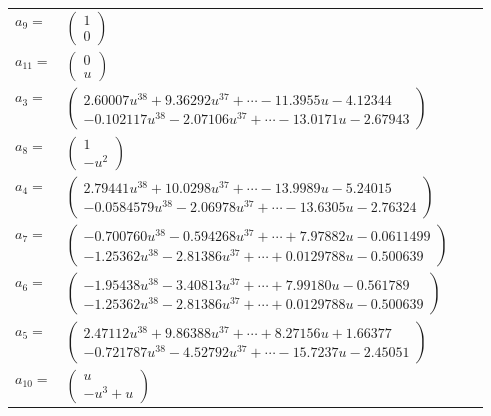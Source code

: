 \documentclass[1p]{elsarticle_modified}
\theoremstyle{definition}
\begin{document}
\begin{tabular}{m{7pt} m{180pt} m{7pt} m{180pt} }
\flushright $a_{9}=$&$\begin{pmatrix}1\\0\end{pmatrix}$ \\
\flushright $a_{11}=$&$\begin{pmatrix}0\\u\end{pmatrix}$ \\
\flushright $a_{3}=$&$\begin{pmatrix}2.60007 u^{38}+9.36292 u^{37}+\cdots-11.3955 u-4.12344\\-0.102117 u^{38}-2.07106 u^{37}+\cdots-13.0171 u-2.67943\end{pmatrix}$ \\
\flushright $a_{8}=$&$\begin{pmatrix}1\\- u^2\end{pmatrix}$ \\
\flushright $a_{4}=$&$\begin{pmatrix}2.79441 u^{38}+10.0298 u^{37}+\cdots-13.9989 u-5.24015\\-0.0584579 u^{38}-2.06978 u^{37}+\cdots-13.6305 u-2.76324\end{pmatrix}$ \\
\flushright $a_{7}=$&$\begin{pmatrix}-0.700760 u^{38}-0.594268 u^{37}+\cdots+7.97882 u-0.0611499\\-1.25362 u^{38}-2.81386 u^{37}+\cdots+0.0129788 u-0.500639\end{pmatrix}$ \\
\flushright $a_{6}=$&$\begin{pmatrix}-1.95438 u^{38}-3.40813 u^{37}+\cdots+7.99180 u-0.561789\\-1.25362 u^{38}-2.81386 u^{37}+\cdots+0.0129788 u-0.500639\end{pmatrix}$ \\
\flushright $a_{5}=$&$\begin{pmatrix}2.47112 u^{38}+9.86388 u^{37}+\cdots+8.27156 u+1.66377\\-0.721787 u^{38}-4.52792 u^{37}+\cdots-15.7237 u-2.45051\end{pmatrix}$ \\
\flushright $a_{10}=$&$\begin{pmatrix}u\\- u^3+u\end{pmatrix}$ \\

\end{tabular}
\end{document}
